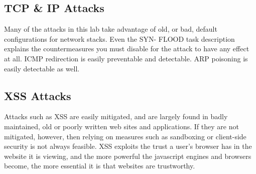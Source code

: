 \subsection{TCP \& IP Attacks} 

Many of the attacks in this lab take advantage of old, or bad, default configurations for network stacks. Even the SYN-
FLOOD task description explains the countermeasures you must disable for the attack to have any effect at all. ICMP
redirection is easily preventable and detectable. ARP poisoning is easily detectable as well.

\subsection{XSS Attacks}

Attacks such as XSS are easily mitigated\cite{cheatsheet}, and are largely found in badly maintained, old or poorly
written web sites and applications. If they are not mitigated, however, then relying on measures such as sandboxing or
client-side security is not always feasible. XSS exploits the trust a user's browser has in the website it is viewing,
and the more powerful the javascript engines and browsers  become, the more essential it is that websites are
trustworthy.
